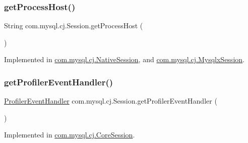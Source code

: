 \mbox{\label{interfacecom_1_1mysql_1_1cj_1_1_session_a04063248e91bc3aa9dbe8d4db1d0a4c2}} 
\subsubsection{\texorpdfstring{get\+Process\+Host()}{getProcessHost()}}
{\footnotesize\ttfamily String com.\+mysql.\+cj.\+Session.\+get\+Process\+Host (\begin{DoxyParamCaption}{ }\end{DoxyParamCaption})}



Implemented in \mbox{\hyperlink{classcom_1_1mysql_1_1cj_1_1_native_session_ad4fcecc07b825e551a6ba61534ef36d9}{com.\+mysql.\+cj.\+Native\+Session}}, and \mbox{\hyperlink{classcom_1_1mysql_1_1cj_1_1_mysqlx_session_aacede9795b96289068a7fe193700cb2c}{com.\+mysql.\+cj.\+Mysqlx\+Session}}.

\mbox{\label{interfacecom_1_1mysql_1_1cj_1_1_session_ae756dd958f6327818e84c16066b288df}} 
\subsubsection{\texorpdfstring{get\+Profiler\+Event\+Handler()}{getProfilerEventHandler()}}
{\footnotesize\ttfamily \mbox{\hyperlink{interfacecom_1_1mysql_1_1cj_1_1log_1_1_profiler_event_handler}{Profiler\+Event\+Handler}} com.\+mysql.\+cj.\+Session.\+get\+Profiler\+Event\+Handler (\begin{DoxyParamCaption}{ }\end{DoxyParamCaption})}



Implemented in \mbox{\hyperlink{classcom_1_1mysql_1_1cj_1_1_core_session_ada22cc07db1eb2fb753966f8b0e74183}{com.\+mysql.\+cj.\+Core\+Session}}.

\mbox{\label{interfacecom_1_1mysql_1_1cj_1_1_session_a76c18a20fdd1ad088a8053f236c57eb5}} 
